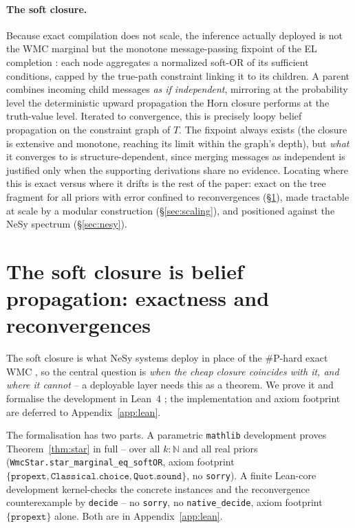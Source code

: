 \documentclass[anon]{nesy2026}
\begin{document}
\paragraph{The soft closure.}
Because exact compilation does not scale, the inference actually deployed is not the WMC marginal
but the monotone message-passing fixpoint of the EL completion \citep{kazakov2014elk}: each node
aggregates a normalized soft-OR of its sufficient conditions, capped by the true-path constraint
linking it to its children. A parent combines incoming child messages \emph{as if independent},
mirroring at the probability level the deterministic upward propagation the Horn closure performs
at the truth-value level. Iterated to convergence, this is precisely loopy belief propagation
\citep{pearl1988probabilistic} on the constraint graph of $T$. The fixpoint always exists (the
closure is extensive and monotone, reaching its limit within the graph's depth), but \emph{what}
it converges to is structure-dependent, since merging messages as independent is justified only
when the supporting derivations share no evidence. Locating where this is exact versus where it
drifts is the rest of the paper: exact on the tree fragment for all priors with
error confined to reconvergences (\S\ref{sec:lean}), made tractable at scale by a modular
construction (\S\ref{sec:scaling}), and positioned against the NeSy spectrum (\S\ref{sec:nesy}).

\section{The soft closure is belief propagation: exactness and reconvergences}\label{sec:lean}

The soft closure is what NeSy systems deploy in place of the \#P-hard exact WMC \citep{chavira2008wmc}, so the central question is \emph{when the cheap closure coincides with it, and where it cannot} -- a deployable layer needs this as a theorem. We prove it and formalise the development in Lean~4 \citep{demoura2021lean}; the implementation and axiom footprint are deferred to Appendix~\ref{app:lean}.

The formalisation has two parts. A parametric \texttt{mathlib} development proves
Theorem~\ref{thm:star} in full -- over all $k:\mathbb{N}$ and all real priors
(\texttt{WmcStar.star\_marginal\_eq\_softOR}, axiom footprint
$\{\texttt{propext},\texttt{Classical.choice},\texttt{Quot.sound}\}$, no \texttt{sorry}). A
finite Lean-core development kernel-checks the concrete instances and the reconvergence
counterexample by \texttt{decide} -- no \texttt{sorry}, no \texttt{native\_decide}, axiom
footprint $\{\texttt{propext}\}$ alone. Both are in Appendix~\ref{app:lean}.
\end{document}
